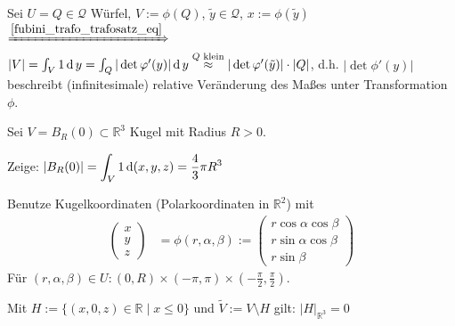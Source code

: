 Sei $U=Q\in\mathcal{Q}$ Würfel, $V:= \phi(Q)$, $\tilde{y}\in \mathcal{Q}$, $x:= \phi(\tilde{y})$ \\
$\xRightarrow{\eqref{fubini_trafo_trafosatz_eq}}$ $\vert V \vert = \int_V 1 \operatorname{d} y = \int_Q \vert \det \varphi'(y) \vert \operatorname{d} y \overset{\text{$Q$ klein}}{\approx} \vert \det \varphi'(\tilde{y})\vert \cdot \vert Q \vert$, d.h. $\vert \det \phi'(y) \vert$ beschreibt (infinitesimale) relative Veränderung des Maßes unter Transformation $\phi$.

\begin{example}
	Sei $V=B_R(0) \subset\mathbb{R}^3$ Kugel mit Radius $R > 0$.
	
	Zeige: $\displaystyle \vert B_R(0) \vert = \int_V 1\operatorname{d} (x,y,z) = \frac{4}{3}\pi R^3$
	
	Benutze Kugelkoordinaten (Polarkoordinaten in $\mathbb{R}^2$) mit \begin{align*}
		\begin{pmatrix}
			x \\ y \\ z
		\end{pmatrix} &= \phi(r, \alpha, \beta) := \begin{pmatrix}
			r \cos \alpha \cos \beta \\ r\sin \alpha \cos \beta \\ r \sin \beta
		\end{pmatrix}
	\end{align*}
	Für $(r,\alpha,\beta)\in U: (0,R)\times(-\pi,\pi)\times\left(-\frac{\pi}{2},\frac{\pi}{2}\right)$.
	
	Mit $H:= \{ (x,0,z)\in\mathbb{R}\mid x\le 0 \}$ und $\tilde{V} := V\setminus H$ gilt: $\vert H\vert_{\mathbb{R}^3} = 0$
	

\end{example}
